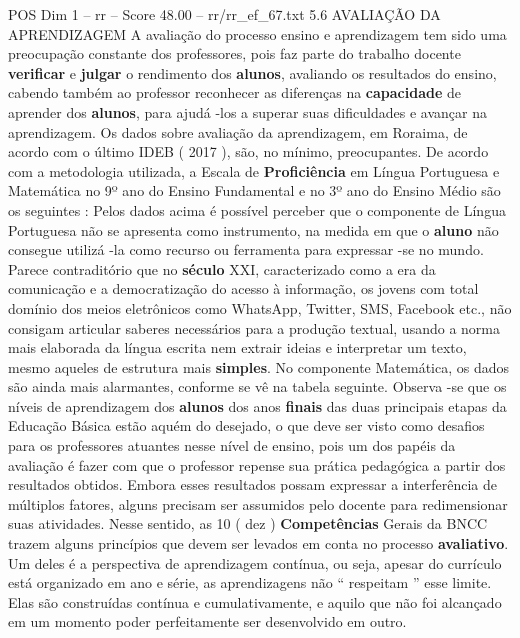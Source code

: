 \begin{textsample}{POS Dim 1 – rr – Score 48.00 – rr/rr\_ef\_67.txt}  \label{ex:f1_pos_216}
5.6 AVALIAÇÃO DA APRENDIZAGEM A avaliação do processo ensino e aprendizagem tem sido uma preocupação constante dos professores, pois faz parte do trabalho docente \textbf{verificar} e \textbf{julgar} o rendimento dos \textbf{alunos}, avaliando os resultados do ensino, cabendo também ao professor reconhecer as diferenças na \textbf{capacidade} de aprender dos \textbf{alunos}, para ajudá -los a superar suas dificuldades e avançar na aprendizagem.
Os dados sobre avaliação da aprendizagem, em Roraima, de acordo com o último IDEB ( 2017 ), são, no mínimo, preocupantes.
De acordo com a metodologia utilizada, a Escala de \textbf{Proficiência} em Língua Portuguesa e Matemática no 9º ano do Ensino Fundamental e no 3º ano do Ensino Médio são os seguintes : Pelos dados acima é possível perceber que o componente de Língua Portuguesa não se apresenta como instrumento, na medida em que o \textbf{aluno} não consegue utilizá -la como recurso ou ferramenta para expressar -se no mundo.
Parece contraditório que no \textbf{século} XXI, caracterizado como a era da comunicação e a democratização do acesso à informação, os jovens com total domínio dos meios eletrônicos como WhatsApp, Twitter, SMS, Facebook etc., não consigam articular saberes necessários para a produção textual, usando a norma mais elaborada da língua escrita nem extrair ideias e interpretar um texto, mesmo aqueles de estrutura mais \textbf{simples}.
No componente Matemática, os dados são ainda mais alarmantes, conforme se vê na tabela seguinte.
Observa -se que os níveis de aprendizagem dos \textbf{alunos} dos anos \textbf{finais} das duas principais etapas da Educação Básica estão aquém do desejado, o que deve ser visto como desafios para os professores atuantes nesse nível de ensino, pois um dos papéis da avaliação é fazer com que o professor repense sua prática pedagógica a partir dos resultados obtidos.
Embora esses resultados possam expressar a interferência de múltiplos fatores, alguns precisam ser assumidos pelo docente para redimensionar suas atividades.
Nesse sentido, as 10 ( dez ) \textbf{Competências} Gerais da BNCC trazem alguns princípios que devem ser levados em conta no processo \textbf{avaliativo}.
Um deles é a perspectiva de aprendizagem contínua, ou seja, apesar do currículo está organizado em ano e série, as aprendizagens não “ respeitam ” esse limite.
Elas são construídas contínua e cumulativamente, e aquilo que não foi alcançado em um momento poder perfeitamente ser desenvolvido em outro.

\end{textsample}

